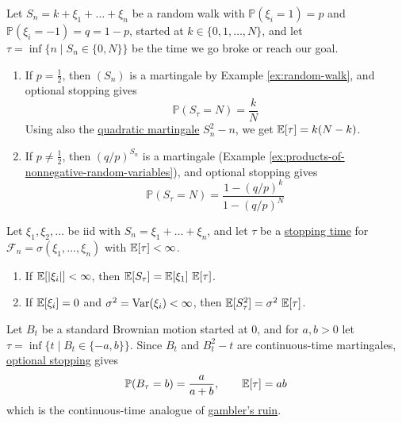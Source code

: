 	\begin{example}
	  \label{ex:gamblers-ruin}
		Let $S_n = k + \xi_1 + \ldots + \xi_n$ be a random walk with $\mathbb{P}(\xi_i = 1) = p$ and $\mathbb{P}(\xi_i = -1) = q = 1 - p$, started at $k \in \{0, 1, \ldots, N\}$, and let $\tau = \inf\{n \mid S_n \in \{0, N\}\}$ be the time we go broke or reach our goal. 
		\begin{enumerate}
			\item If $p = \frac{1}{2}$, then $(S_n)$ is a martingale by Example \ref{ex:random-walk}, and optional stopping gives 
				\begin{equation}
					\mathbb{P}(S_\tau = N) = \frac{k}{N}
				\end{equation}
			Using also the \hyperref[ex:quadratic-martingale]{quadratic martingale} $S_n^2 - n$, we get $\operatorname{\mathbb{E}}[\tau] = k(N - k)$. 
			\item If $p \neq \frac{1}{2}$, then $(q/p)^{S_n}$ is a martingale (Example \ref{ex:products-of-nonnegative-random-variables}), and optional stopping gives 
				\begin{equation}
					\mathbb{P}(S_\tau = N) = \frac{1 - (q/p)^k}{1 - (q/p)^N}
				\end{equation}
		\end{enumerate}
	\end{example}

	\begin{theorem}
	  \label{thm:walds-identities}
		Let $\xi_1, \xi_2, \ldots$ be iid with $S_n = \xi_1 + \ldots + \xi_n$, and let $\tau$ be a \hyperref[def:stopping-time]{stopping time} for $\mathcal{F}_n = \sigma(\xi_1, \ldots, \xi_n)$ with $\operatorname{\mathbb{E}}[\tau] < \infty$. 
		\begin{enumerate}
			\item If $\operatorname{\mathbb{E}}[|\xi_i|] < \infty$, then $\operatorname{\mathbb{E}}[S_\tau] = \operatorname{\mathbb{E}}[\xi_1] \, \operatorname{\mathbb{E}}[\tau]$. 
			\item If $\operatorname{\mathbb{E}}[\xi_i] = 0$ and $\sigma^2 = \operatorname{Var}(\xi_i) < \infty$, then $\operatorname{\mathbb{E}}[S_\tau^2] = \sigma^2 \, \operatorname{\mathbb{E}}[\tau]$. 
		\end{enumerate}
	\end{theorem}

	\begin{example}
	  \label{ex:brownian-exit}
		Let $B_t$ be a standard Brownian motion started at $0$, and for $a, b > 0$ let $\tau = \inf\{t \mid B_t \in \{-a, b\}\}$. Since $B_t$ and $B_t^2 - t$ are continuous-time martingales, \hyperref[thm:optional-stopping]{optional stopping} gives 
		\begin{equation}
			\mathbb{P}(B_\tau = b) = \frac{a}{a + b}, \qquad \operatorname{\mathbb{E}}[\tau] = ab
		\end{equation}
		which is the continuous-time analogue of \hyperref[ex:gamblers-ruin]{gambler's ruin}. 
	\end{example}

